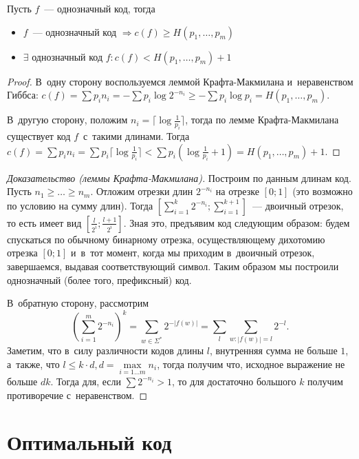 \documentclass{article}
\begin{document}
\begin{theorem}
	Пусть $f$~--- однозначный код, тогда
	\begin{itemize}
		\item $f$~--- однозначный код $\Rightarrow c(f) \ge H(p_1, \ldots, p_m)$
		\item $\exists$ однозначный код $f: c(f) < H(p_1, \ldots, p_m) + 1$
	\end{itemize}
\end{theorem}
\begin{proof}
	В~одну сторону воспользуемся леммой Крафта-Макмилана и~неравенством Гиббса:
	$c(f) = \sum p_i n_i = -\sum p_i \log 2^{-n_i} \ge -\sum p_i \log p_i = H(p_1,
	\ldots, p_m)$.

	В~другую сторону, положим $n_i = \lceil \log \frac{1}{p_i} \rceil$, тогда
	по лемме Крафта-Макмилана существует код $f$~с~такими длинами. Тогда $c(f) =
	\sum p_i n_i = \sum p_i \lceil \log \frac{1}{p_i} \rceil < \sum p_i (\log
	\frac{1}{p_i} + 1) = H(p_1, \ldots, p_m) + 1$.
\end{proof}

\begin{proof}[Доказательство (леммы Крафта-Макмилана)]
	Построим по данным длинам код. Пусть $n_1 \ge \ldots \ge n_m$. Отложим отрезки
	длин $2^{-n_i}$ на отрезке $[0; 1]$ (это возможно по условию на сумму длин).
	Тогда $[\sum\limits_{i=1}^k 2^{-n_i}; \sum\limits_{i=1}^{k+1}]$~--- двоичный
	отрезок, то есть имеет вид $[\frac{l}{2^i}; \frac{l+1}{2^i}]$. Зная это,
	предъявим код следующим образом: будем спускаться по обычному бинарному
	отрезка, осуществляющему дихотомию отрезка $[0; 1]$ и~в~тот момент, когда мы
	приходим в~двоичный отрезок, завершаемся, выдавая соответствующий символ.
	Таким образом мы построили однозначный (более того, префиксный) код.

	В~обратную сторону, рассмотрим
	$$(\sum\limits_{i=1}^m 2^{-n_i})^k =
	\sum\limits_{w \in \Sigma^\ast} 2^{-|f(w)|} = \sum\limits_{l} \sum\limits_{w:
	|f(w)| = l} 2^{-l}.$$
	Заметим, что в~силу различности кодов длины $l$, внутренняя сумма не больше
	$1$, а~также, что $l \le k \cdot d, d = \max\limits_{i=1 \ldots m} n_i$, тогда
	получим что, исходное выражение не больше $dk$. Тогда для, если $\sum 2^{-n_i}
	> 1$, то для достаточно большого $k$ получим противоречие с~неравенством.
\end{proof}

\section{Оптимальный код}
\end{document}

